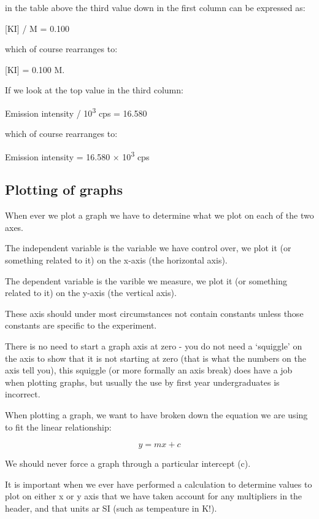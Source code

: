 \documentclass[
]{book}
\begin{document}
in the table above the third value down in the first column can be expressed as:

{[}KI{]} / M = 0.100

which of course rearranges to:

{[}KI{]} = 0.100 M.

If we look at the top value in the third column:

Emission intensity / 10\textsuperscript{3} cps = 16.580

which of course rearranges to:

Emission intensity = 16.580 × 10\textsuperscript{3} cps

\hypertarget{subsec:plotting}{%
\subsection{Plotting of graphs}\label{subsec:plotting}}

When ever we plot a graph we have to determine what we plot on each of the two axes.

The independent variable is the variable we have control over, we plot it (or something related to it) on the x-axis (the horizontal axis).

The dependent variable is the varible we measure, we plot it (or something related to it) on the y-axis (the vertical axis).

These axis should under most circumstances not contain constants unless those constants are specific to the experiment.

There is no need to start a graph axis at zero - you do not need a `squiggle' on the axis to show that it is not starting at zero (that is what the numbers on the axis tell you), this squiggle (or more formally an axis break) does have a job when plotting graphs, but usually the use by first year undergraduates is incorrect.

When plotting a graph, we want to have broken down the equation we are using to fit the linear relationship:

\begin{equation}
y = mx+c
\label{eq:linearplot}
\end{equation}

We should never force a graph through a particular intercept (c).

It is important when we ever have performed a calculation to determine values to plot on either x or y axis that we have taken account for any multipliers in the header, and that units ar SI (such as tempeature in K!).
\end{document}
